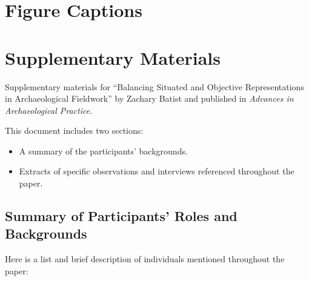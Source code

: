 \documentclass{article}
\begin{document}
\newpage
\section{Figure Captions}






\newpage
\section{Supplementary Materials}\label{supplementary-materials}

Supplementary materials for ``Balancing Situated and Objective
Representations in Archaeological Fieldwork'' by Zachary Batist and
published in \emph{Advances in Archaeological Practice}.\newline

This document includes two sections:

\begin{itemize}
\item
  A summary of the participants' backgrounds.
\item
  Extracts of specific observations and interviews referenced throughout
  the paper.
\end{itemize}

\subsection{Summary of Participants' Roles and Backgrounds}\label{summary-of-participants-roles-and-backgrounds}

Here is a list and brief description of individuals mentioned throughout the paper:\newline
\end{document}
